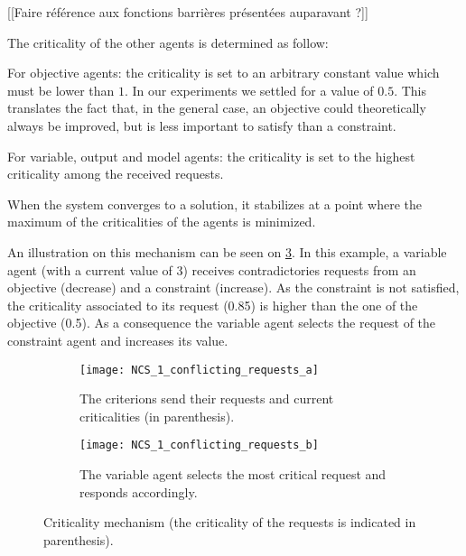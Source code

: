 [[Faire référence aux fonctions barrières présentées auparavant ?]]

\noindent The criticality of the other agents is determined as follow:

\begin{compactitem}
\item For objective agents: the criticality is set to an arbitrary constant value which must be lower than \(1\). In our experiments we settled for a value of \(0.5\). This translates the fact that, in the general case, an objective could theoretically always be improved, but is less important to satisfy than a constraint.
\item For variable, output and model agents: the criticality is set to the highest criticality among the received requests.
\end{compactitem}

When the system converges to a solution, it stabilizes at a point where the maximum of the criticalities of the agents is minimized.

An illustration on this mechanism can be seen on \figureref{} \ref{NCS_1_conflicting_requests}. In this example, a variable agent (with a current value of 3) receives contradictories requests from an objective (decrease) and a constraint (increase). As the constraint is not satisfied, the criticality associated to its request (0.85) is higher than the one of the objective (0.5). As a consequence the variable agent selects the request of the constraint agent and increases its value.

\begin{figure}
	\centering
	\begin{subfigure}[b]{0.45\textwidth}
		\centering
		\texttt{[image: NCS\_1\_conflicting\_requests\_a]}
		\caption{The criterions send their requests and current criticalities (in parenthesis).}\label{NCS_1_conflicting_requests_a}
	\end{subfigure}
	\hfill
	\begin{subfigure}[b]{0.45\textwidth}
		\centering
		\texttt{[image: NCS\_1\_conflicting\_requests\_b]}
		\caption{The variable agent selects the most critical request and responds accordingly.}\label{NCS_1_conflicting_requests_b}
	\end{subfigure}
	
\caption{Criticality mechanism (the criticality of the requests is indicated in parenthesis).}\label{NCS_1_conflicting_requests}
\end{figure}

